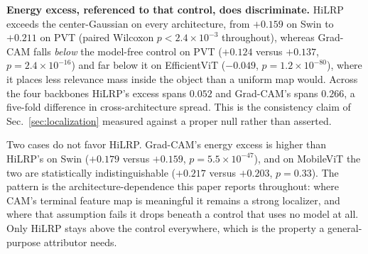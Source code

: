 \documentclass[lettersize,journal]{IEEEtran}
\theoremstyle{definition}
\theoremstyle{plain}
\begin{document}
\textbf{Energy excess, referenced to that control, does discriminate.} HiLRP exceeds the center-Gaussian on every architecture, from $+0.159$ on Swin to $+0.211$ on PVT (paired Wilcoxon $p<2.4{\times}10^{-3}$ throughout), whereas Grad-CAM falls \emph{below} the model-free control on PVT ($+0.124$ versus $+0.137$, $p=2.4{\times}10^{-16}$) and far below it on EfficientViT ($-0.049$, $p=1.2{\times}10^{-80}$), where it places less relevance mass inside the object than a uniform map would. Across the four backbones HiLRP's excess spans $0.052$ and Grad-CAM's spans $0.266$, a five-fold difference in cross-architecture spread. This is the consistency claim of Sec.~\ref{sec:localization} measured against a proper null rather than asserted.

Two cases do not favor HiLRP. Grad-CAM's energy excess is higher than HiLRP's on Swin ($+0.179$ versus $+0.159$, $p=5.5{\times}10^{-47}$), and on MobileViT the two are statistically indistinguishable ($+0.217$ versus $+0.203$, $p=0.33$). The pattern is the architecture-dependence this paper reports throughout: where CAM's terminal feature map is meaningful it remains a strong localizer, and where that assumption fails it drops beneath a control that uses no model at all. Only HiLRP stays above the control everywhere, which is the property a general-purpose attributor needs.
\end{document}
